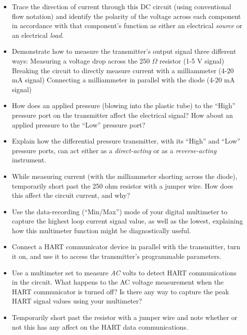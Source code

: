\begin{itemize}
\item{} Trace the direction of current through this DC circuit (using conventional flow notation) and identify the polarity of the voltage across each component in accordance with that component's function as either an electrical {\it source} or an electrical {\it load}.
\vskip 10pt
\item{} Demonstrate how to measure the transmitter's output signal three different ways:
\itemitem{} Measuring a voltage drop across the 250 $\Omega$ resistor (1-5 V signal)
\itemitem{} Breaking the circuit to directly measure current with a milliammeter (4-20 mA signal)
\itemitem{} Connecting a milliammeter in parallel with the diode (4-20 mA signal)
\vskip 10pt
\item{} How does an applied pressure (blowing into the plastic tube) to the ``High'' pressure port on the transmitter affect the electrical signal?  How about an applied pressure to the ``Low'' pressure port?
\vskip 10pt
\item{} Explain how the differential pressure transmitter, with its ``High'' and ``Low'' pressure ports, can act either as a {\it direct-acting} or as a {\it reverse-acting} instrument.
\vskip 10pt
\item{} While measuring current (with the milliammeter shorting across the diode), temporarily short past the 250 ohm resistor with a jumper wire.  How does this affect the circuit current, and why?
\vskip 10pt
\item{} Use the data-recording (``Min/Max'') mode of your digital multimeter to capture the highest loop current signal value, as well as the lowest, explaining how this multimeter function might be diagnostically useful.
\vskip 10pt
\item{} Connect a HART communicator device in parallel with the transmitter, turn it on, and use it to access the transmitter's programmable parameters.
\vskip 10pt
\item{} Use a multimeter set to measure {\it AC} volts to detect HART communications in the circuit.  What happens to the AC voltage measurement when the HART communicator is turned off?  Is there any way to capture the peak HART signal values using your multimeter?
\vskip 10pt
\item{} Temporarily short past the resistor with a jumper wire and note whether or not this has any affect on the HART data communications.
\end{itemize}

